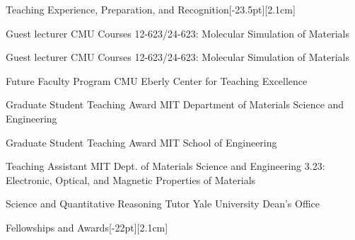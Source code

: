 \documentclass{cv} %
\begin{document}
\begin{cvSection}{Teaching Experience, Preparation, and Recognition}[-23.5pt][2.1cm]

    {Guest lecturer}
    {CMU Courses 12-623/24-623: Molecular Simulation of Materials}{}

    {}
           
    {Guest lecturer}
    {CMU Courses 12-623/24-623: Molecular Simulation of Materials}
    {}
    {}

    \cvItem{}
    {Future Faculty Program}
    {CMU Eberly Center for Teaching Excellence}
    {}
  
    {Graduate Student Teaching Award}
    {MIT Department of Materials Science and Engineering}
    {}

    \cvItem{}
    {Graduate Student Teaching Award}
    {MIT School of Engineering}
    {}
  
    {Teaching Assistant}
    {MIT Dept. of Materials Science and Engineering}
    {\vspace{14pt}3.23: Electronic, Optical, and Magnetic Properties of Materials}
    
    {Science and Quantitative Reasoning Tutor}
    {Yale University Dean's Office}
    {}

\end{cvSection}

\begin{cvSection}{Fellowships and Awards}[-22pt][2.1cm]
    
\end{cvSection}

\begin{pubsSection}[-7pt][2.1cm]
  
\end{pubsSection}

%     
\end{document}
